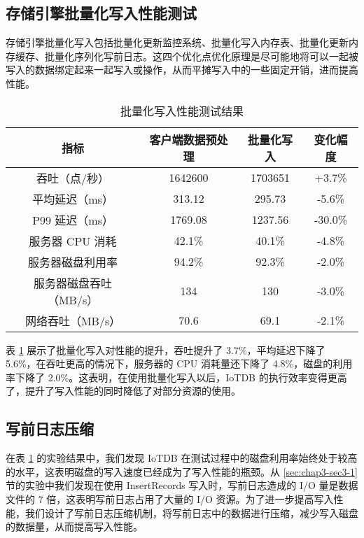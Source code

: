 \subsection{存储引擎批量化写入性能测试}
存储引擎批量化写入包括批量化更新监控系统、批量化写入内存表、批量化更新内存缓存、批量化序列化写前日志。这四个优化点优化原理是尽可能地将可以一起被写入的数据绑定起来一起写入或操作，从而平摊写入中的一些固定开销，进而提高性能。
\begin{table}
  \centering
  \caption{批量化写入性能测试结果}
  \begin{tabular}{cccc}
    \toprule 
    指标 & 客户端数据预处理 & 批量化写入 & 变化幅度 \\ 
    \midrule  
    吞吐（点/秒） & 1642600 & 1703651 & +3.7\%\\  
    平均延迟（ms） & 313.12 & 295.73 & -5.6\%\\  
    P99 延迟（ms） & 1769.08 & 1237.56 & -30.0\% \\  
    服务器 CPU 消耗 & 42.1\% & 40.1\% & -4.8\%\\  
    服务器磁盘利用率 & 94.2\% & 92.3\% & -2.0\%\\  
    服务器磁盘吞吐（MB/s） & 134 & 130 & -3.0\% \\  
    网络吞吐（MB/s） & 70.6 & 69.1 & -2.1\%\\  
    \bottomrule
  \end{tabular}
  \label{tabular:batch-write-performance}
\end{table}

表 \ref{tabular:batch-write-performance} 展示了批量化写入对性能的提升，吞吐提升了 3.7\%，平均延迟下降了 5.6\%，在吞吐更高的情况下，服务器的 CPU 消耗量还下降了 4.8\%，磁盘的利用率下降了 2.0\%。这表明，在使用批量化写入以后，IoTDB 的执行效率变得更高了，提升了写入性能的同时降低了对部分资源的使用。

\subsection{写前日志压缩}
在表 \ref{tabular:batch-write-performance} 的实验结果中，我们发现 IoTDB 在测试过程中的磁盘利用率始终处于较高的水平，这表明磁盘的写入速度已经成为了写入性能的瓶颈。从 \ref{sec:chap3-sec3-1} 节的实验中我们发现在使用 InsertRecords 写入时，写前日志造成的 I/O 量是数据文件的 7 倍，这表明写前日志占用了大量的 I/O 资源。为了进一步提高写入性能，我们设计了写前日志压缩机制，将写前日志中的数据进行压缩，减少写入磁盘的数据量，从而提高写入性能。

